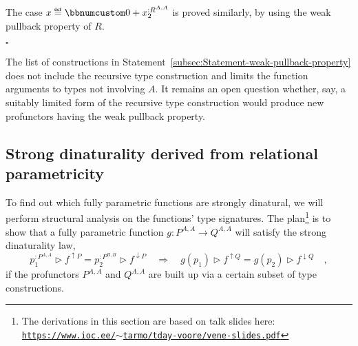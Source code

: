 The case $x\triangleq\bbnum 0+x_{2}^{:R^{A,A}}$ is proved similarly,
by using the weak pullback property of $R$. %
\begin{comment}
\textbf{(f)} Rewrite the wedge relation for $x^{:S^{A,A,P^{A,A}}}$
and $y^{:S^{B,B,P^{B,B}}}$ by using the explicit liftings to $S$:
\[
x\triangleright f^{\uparrow S^{A,\bullet,P^{A,A}}}\bef\big(\overline{f^{\uparrow P^{A,\bullet}}}\big)^{\uparrow S^{A,B,\bullet}}=y\triangleright f^{\downarrow S^{\bullet,B,P^{B,B}}}\bef\big(\overline{f^{\downarrow P^{\bullet,B}}}\big)^{\uparrow S^{A,B,\bullet}}\quad.
\]
Due to the commutativity law of $S$, we may exchange the order of
compositions here:
\[
f^{\uparrow S^{A,\bullet,P^{A,B}}}\big(x\triangleright(f^{\uparrow P^{A,\bullet}})^{\uparrow S^{A,A,\bullet}}\big)=y\triangleright\big(\overline{f^{\downarrow P^{\bullet,B}}}\big)^{\uparrow S^{B,B,\bullet}}\triangleright f^{\downarrow S^{\bullet,B,P^{A,B}}}\quad.
\]
Now we can use the weak pullback property of $S$ to obtain some $z:S^{B,A,P^{A,B}}$
such that
\[
x\triangleright\big(\overline{f^{\uparrow P^{A,\bullet}}}\big)^{\uparrow S^{A,A,\bullet}}=z\triangleright f^{\downarrow S^{\bullet,A,P^{A,B}}}\text{ and }y\triangleright\big(\overline{f^{\downarrow P^{\bullet,B}}}\big)^{\uparrow S^{B,B,\bullet}}=z\triangleright f^{\uparrow S^{B,\bullet,P^{A,B}}}\quad.
\]
We need to produce a value $t:S^{B,A,P^{B,A}}$ such that 
\[
x=t\triangleright f^{\downarrow S^{\bullet,A,P^{B,A}}}\bef\big(\overline{f^{\downarrow P^{\bullet,A}}}\big)^{\uparrow S^{A,A,\bullet}}\text{ and }y=t\triangleright f^{\uparrow S^{B,\bullet,P^{B,A}}}\bef\big(\overline{f^{\uparrow P^{B,\bullet}}}\big)^{\uparrow S^{B,B,\bullet}}\quad.
\]
\end{comment}
$\square$

The list of constructions in Statement~\ref{subsec:Statement-weak-pullback-property}
does not include the recursive type construction and limits the function
arguments to types not involving $A$. It remains an open question
whether, say, a suitably limited form of the recursive type construction
would produce new profunctors having the weak pullback property.

\subsection{Strong dinaturality derived from relational parametricity\label{subsec:Strong-dinaturality-derived-from-parametricity}}

To find out which fully parametric functions are strongly dinatural,
we will perform structural analysis on the functions\textsf{'} type signatures.
The plan\footnote{The derivations in this section are based on talk slides here: \texttt{\href{https://www.ioc.ee/~tarmo/tday-voore/vene-slides.pdf}{https://www.ioc.ee/$\sim$tarmo/tday-voore/vene-slides.pdf}}}
is to show that a fully parametric function $g:P^{A,A}\rightarrow Q^{A,A}$
will satisfy the strong dinaturality law,
\[
p_{1}^{:P^{A,A}}\triangleright f^{\uparrow P}=p_{2}^{:P^{B,B}}\triangleright f^{\downarrow P}\quad\Rightarrow\quad g(p_{1})\triangleright f^{\uparrow Q}=g(p_{2})\triangleright f^{\downarrow Q}\quad,
\]
if the profunctors $P^{A,A}$ and $Q^{A,A}$ are built up via a certain
subset of type constructions. 

